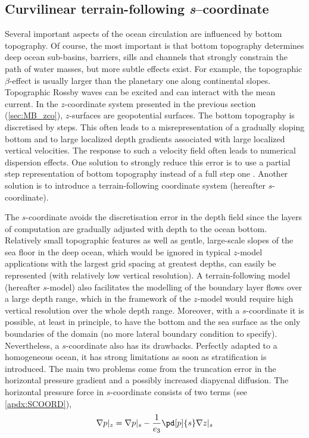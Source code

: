 \documentclass[../main/NEMO_manual]{subfiles}
\begin{document}
\subsection{Curvilinear terrain-following \textit{s}--coordinate}
\label{subsec:MB_sco}

Several important aspects of the ocean circulation are influenced by bottom topography.
Of course, the most important is that bottom topography determines deep ocean sub-basins, barriers,
sills and channels that strongly constrain the path of water masses, but more subtle effects exist.
For example,
the topographic $\beta$-effect is usually larger than the planetary one along continental slopes.
Topographic Rossby waves can be excited and can interact with the mean current.
In the $z$-coordinate system presented in the previous section (\autoref{sec:MB_zco}),
$z$-surfaces are geopotential surfaces.
The bottom topography is discretised by steps.
This often leads to a misrepresentation of a gradually sloping bottom and to
large localized depth gradients associated with large localized vertical velocities.
The response to such a velocity field often leads to numerical dispersion effects.
One solution to strongly reduce this error is to use a partial step representation of
bottom topography instead of a full step one \cite{pacanowski.gnanadesikan_MWR98}.
Another solution is to introduce a terrain-following coordinate system (hereafter $s$-coordinate).

The $s$-coordinate avoids the discretisation error in the depth field since
the layers of computation are gradually adjusted with depth to the ocean bottom.
Relatively small topographic features as well as
gentle, large-scale slopes of the sea floor in the deep ocean,
which would be ignored in typical $z$-model applications with
the largest grid spacing at greatest depths,
can easily be represented (with relatively low vertical resolution).
A terrain-following model (hereafter $s$-model) also facilitates
the modelling of the boundary layer flows over a large depth range,
which in the framework of the $z$-model would require high vertical resolution over
the whole depth range.
Moreover,
with a $s$-coordinate it is possible, at least in principle, to have the bottom and the sea surface as
the only boundaries of the domain (no more lateral boundary condition to specify).
Nevertheless, a $s$-coordinate also has its drawbacks.
Perfectly adapted to a homogeneous ocean,
it has strong limitations as soon as stratification is introduced.
The main two problems come from the truncation error in the horizontal pressure gradient and
a possibly increased diapycnal diffusion.
The horizontal pressure force in $s$-coordinate consists of two terms (see \autoref{apdx:SCOORD}),
\begin{equation}
  \label{eq:MB_p_sco}
  \nabla p |_z = \nabla p |_s - \frac{1}{e_3} \pd[p]{s} \nabla z |_s
\end{equation}
\end{document}
